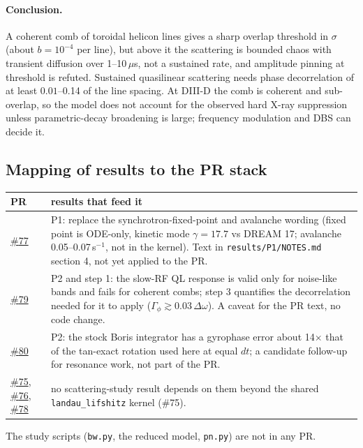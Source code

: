 \documentclass[10pt,a4paper]{article}
\newcommand{\pr}[1]{\href{https://github.com/uwplasma/JAX-in-Cell/pull/#1}{\#{#1}}}
\begin{document}
\paragraph{Conclusion.} A coherent comb of toroidal helicon lines gives a sharp overlap threshold in $\sigma$ (about $b=10^{-4}$ per line), but above it the scattering is bounded chaos with transient diffusion over 1--10\,$\mu$s, not a sustained rate, and amplitude pinning at threshold is refuted. Sustained quasilinear scattering needs phase decorrelation of at least $0.01$--0.14 of the line spacing. At DIII-D the comb is coherent and sub-overlap, so the model does not account for the observed hard X-ray suppression unless parametric-decay broadening is large; frequency modulation and DBS can decide it.

\subsection{Mapping of results to the PR stack}
\begin{table}[H]\centering\small\begin{tabular}{@{}lp{12cm}@{}}\toprule
PR & results that feed it\\\midrule
\pr{77} & P1: replace the synchrotron-fixed-point and avalanche wording (fixed point is ODE-only, kinetic mode $\gamma=17.7$ vs DREAM 17; avalanche 0.05--0.07\,s$^{-1}$, not in the kernel). Text in \texttt{results/P1/NOTES.md} section 4, not yet applied to the PR.\\
\pr{79} & P2 and step 1: the slow-RF QL response is valid only for noise-like bands and fails for coherent combs; step 3 quantifies the decorrelation needed for it to apply ($\Gamma_\phi\gtrsim0.03\,\Delta\omega$). A caveat for the PR text, no code change.\\
\pr{80} & P2: the stock Boris integrator has a gyrophase error about 14$\times$ that of the tan-exact rotation used here at equal $dt$; a candidate follow-up for resonance work, not part of the PR.\\
\pr{75}, \pr{76}, \pr{78} & no scattering-study result depends on them beyond the shared \texttt{landau\_lifshitz} kernel (\#75).\\\bottomrule
\end{tabular}\end{table}
The study scripts (\texttt{bw.py}, the reduced model, \texttt{pn.py}) are not in any PR.
\end{document}
